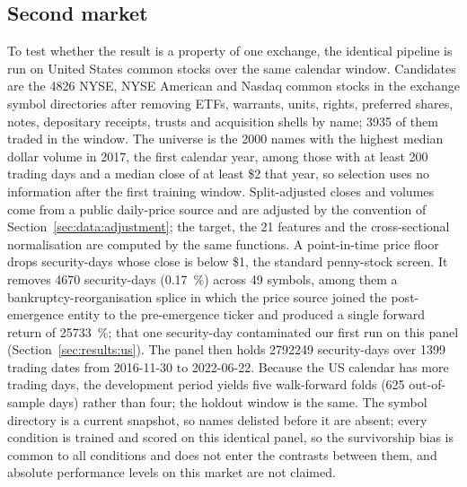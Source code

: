 \subsection{Second market}
\label{sec:data-us}
To test whether the result is a property of one exchange, the identical
pipeline is run on United States common stocks over the same calendar window.
Candidates are the \num{4826} NYSE, NYSE American and Nasdaq common stocks in
the exchange symbol directories after removing ETFs, warrants, units, rights,
preferred shares, notes, depositary receipts, trusts and acquisition shells by
name; \num{3935} of them traded in the window. The universe is the \num{2000}
names with the highest median dollar volume in 2017, the first calendar year,
among those with at least \num{200} trading days and a median close of at least
\$2 that year, so selection uses no information after the first training
window. Split-adjusted closes and volumes come from a public daily-price source and
are adjusted by the convention of Section~\ref{sec:data:adjustment}; the
target, the 21 features and the
cross-sectional normalisation are computed by the same functions. A
point-in-time price floor drops security-days whose close is below \$1, the
standard penny-stock screen. It removes \num{4670} security-days (\SI{0.17}{\percent})
across 49 symbols, among them a bankruptcy-reorganisation splice in which the
price source joined the post-emergence entity to the pre-emergence ticker and
produced a single forward return of \SI{25733}{\percent}; that one
security-day contaminated our first run on this panel
(Section~\ref{sec:results:us}). The panel then holds \num{2792249} security-days over \num{1399} trading dates from
2016-11-30 to 2022-06-22. Because the US calendar has more trading days, the
development period yields five walk-forward folds (\num{625} out-of-sample
days) rather than four; the holdout window is the same. The symbol directory
is a current snapshot, so names delisted before it are absent; every condition
is trained and scored on this identical panel, so the survivorship bias is
common to all conditions and does not enter the contrasts between them,
and absolute performance levels on this market are not claimed.

